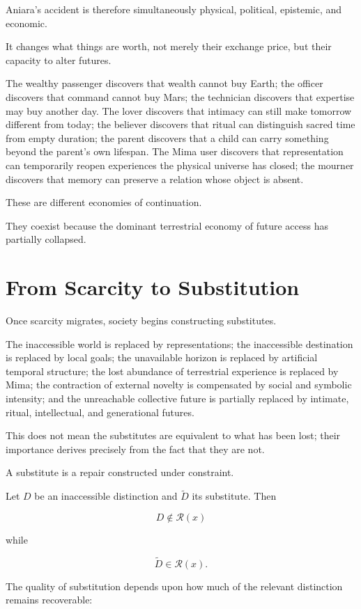 \documentclass[11pt,oneside]{book}
\theoremstyle{definition}
\theoremstyle{remark}
\newcommand{\R}{\mathcal{R}}
\begin{document}
Aniara's accident is therefore simultaneously physical, political, epistemic, and economic.

It changes what things are worth, not merely their exchange price, but their capacity to alter futures.

The wealthy passenger discovers that wealth cannot buy Earth; the officer discovers that command cannot buy Mars; the technician discovers that expertise may buy another day. The lover discovers that intimacy can still make tomorrow different from today; the believer discovers that ritual can distinguish sacred time from empty duration; the parent discovers that a child can carry something beyond the parent's own lifespan. The Mima user discovers that representation can temporarily reopen experiences the physical universe has closed; the mourner discovers that memory can preserve a relation whose object is absent.

These are different economies of continuation.

They coexist because the dominant terrestrial economy of future access has partially collapsed.

\section{From Scarcity to Substitution}

Once scarcity migrates, society begins constructing substitutes.

The inaccessible world is replaced by representations; the inaccessible destination is replaced by local goals; the unavailable horizon is replaced by artificial temporal structure; the lost abundance of terrestrial experience is replaced by Mima; the contraction of external novelty is compensated by social and symbolic intensity; and the unreachable collective future is partially replaced by intimate, ritual, intellectual, and generational futures.

This does not mean the substitutes are equivalent to what has been lost; their importance derives precisely from the fact that they are not.

A substitute is a repair constructed under constraint.

Let \(D\) be an inaccessible distinction and \(\widetilde D\) its substitute. Then

\[
D\notin\R(x)
\]

while

\[
\widetilde D\in\R(x).
\]

The quality of substitution depends upon how much of the relevant distinction remains recoverable:
\end{document}
